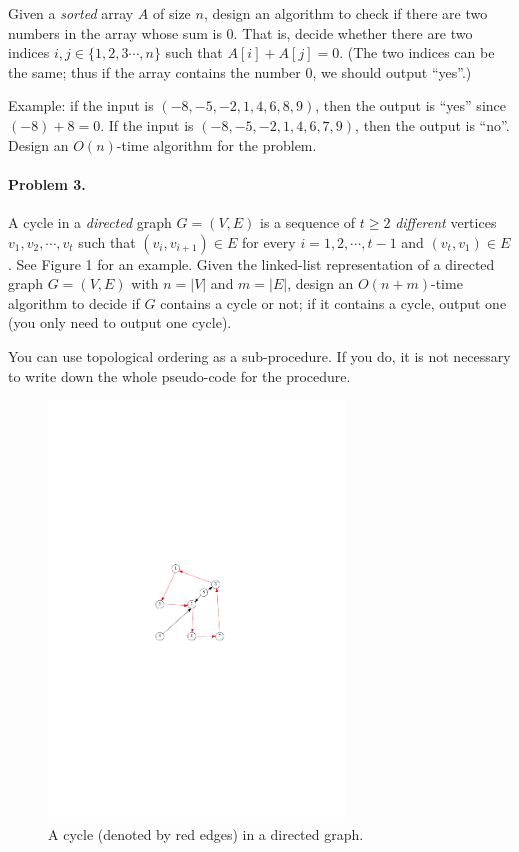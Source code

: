 \documentclass[a4paper, 12pt]{article}
\begin{document}
		Given a \emph{sorted} array $A$ of size $n$, design an algorithm to check if there are two numbers in the array whose sum is $0$.   That is, decide whether there are two indices $i, j \in \{1, 2, 3\cdots, n\}$ such that $A[i] + A[j] = 0$. (The two indices can be the same; thus if the array contains the number 0, we should output ``yes''.) 
		
		Example: if the input is $(-8, -5, -2, 1, 4, 6, 8, 9)$, then the output is ``yes'' since $(-8) + 8 = 0$.  If the input is $(-8, -5, -2, 1, 4, 6, 7, 9)$, then the output is ``no''. 
		Design an $O(n)$-time algorithm for the problem.\smallskip

\noindent\begin{minipage}{0.6\textwidth}
		\paragraph{Problem 3.} 
		A cycle in a \emph{directed} graph $G = (V, E)$ is a sequence of $t \geq 2$ \emph{different} vertices $v_1, v_2, \cdots, v_t$ such that $(v_i, v_{i+1}) \in E$ for every $i = 1, 2, \cdots, t-1$ and $(v_t, v_1) \in E$. See Figure 1 for an example. Given the linked-list representation of a directed graph $G = (V, E)$ with $n = |V|$ and $m = |E|$, design an $O(n + m)$-time algorithm to decide if $G$ contains a cycle or not; if it contains a cycle, output one (you only need to output one cycle).
		
		You can use topological ordering as a sub-procedure. If you do, it is not necessary to write down the whole pseudo-code for the procedure. 
	\end{minipage}
	\hfill
	\begin{minipage}{0.3\textwidth}
		\begin{figure}[H]
			\centering
			\includegraphics[width=0.7\textwidth]{cycle}
			\caption{A cycle (denoted by red edges) in a directed graph.}
		\end{figure}
	\end{minipage}
\end{document}
